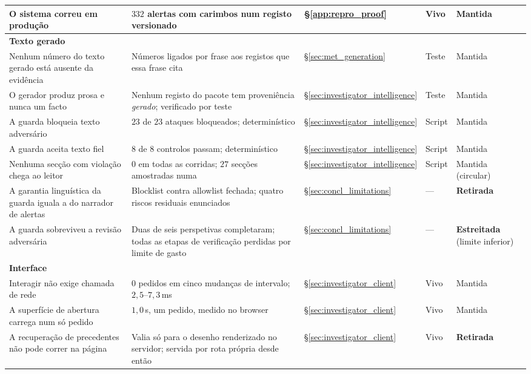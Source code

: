 \begin{table}[ht]
\begin{tabular}{p{4.6cm} p{3.5cm} p{1.6cm} p{1.2cm} p{1.7cm}}
O sistema correu em produção & $332$ alertas com carimbos num registo versionado & §\ref{app:repro_proof} & Vivo & Mantida \\
\midrule
\multicolumn{5}{l}{\textbf{Texto gerado}} \\
Nenhum número do texto gerado está ausente da evidência & Números ligados por frase aos registos que essa frase cita & §\ref{sec:met_generation} & Teste & Mantida \\
O gerador produz prosa e nunca um facto & Nenhum registo do pacote tem proveniência \emph{gerado}; verificado por teste & §\ref{sec:investigator_intelligence} & Teste & Mantida \\
A guarda bloqueia texto adversário & $23$ de $23$ ataques bloqueados; determinístico & §\ref{sec:investigator_intelligence} & Script & Mantida \\
A guarda aceita texto fiel & $8$ de $8$ controlos passam; determinístico & §\ref{sec:investigator_intelligence} & Script & Mantida \\
Nenhuma secção com violação chega ao leitor & $0$ em todas as corridas; $27$ secções amostradas numa & §\ref{sec:investigator_intelligence} & Script & Mantida (circular) \\
A garantia linguística da guarda iguala a do narrador de alertas & Blocklist contra allowlist fechada; quatro riscos residuais enunciados & §\ref{sec:concl_limitations} & --- & \textbf{Retirada} \\
A guarda sobreviveu a revisão adversária & Duas de seis perspetivas completaram; todas as etapas de verificação perdidas por limite de gasto & §\ref{sec:concl_limitations} & --- & \textbf{Estreitada} (limite inferior) \\
\midrule
\multicolumn{5}{l}{\textbf{Interface}} \\
Interagir não exige chamada de rede & $0$ pedidos em cinco mudanças de intervalo; $2,5$--$7,3$\,ms & §\ref{sec:investigator_client} & Vivo & Mantida \\
A superfície de abertura carrega num só pedido & $1,0$\,s, um pedido, medido no browser & §\ref{sec:investigator_client} & Vivo & Mantida \\
A recuperação de precedentes não pode correr na página & Valia só para o desenho renderizado no servidor; servida por rota própria desde então & §\ref{sec:investigator_client} & Vivo & \textbf{Retirada} \\
\bottomrule
\end{tabular}
\end{table}

